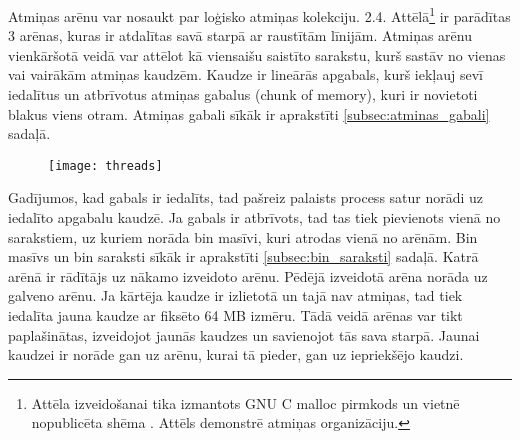 Atmiņas arēnu var nosaukt par loģisko atmiņas kolekciju. 2.4. Attēlā\footnote{Attēla izveidošanai tika izmantots GNU C malloc pirmkods \cite{MALLOC} un vietnē nopublicēta shēma \cite{AMM}. Attēls demonstrē atmiņas organizāciju.} ir parādītas 3 arēnas, kuras ir atdalītas savā starpā ar raustītām līnijām.
 Atmiņas arēnu  vienkāršotā veidā var attēlot kā viensaišu saistīto sarakstu, kurš sastāv no vienas vai vairākām atmiņas kaudzēm. 
 Kaudze ir lineārās apgabals, kurš iekļauj sevī iedalītus un atbrīvotus atmiņas gabalus (chunk of memory), kuri ir novietoti blakus viens otram.
 Atmiņas gabali sīkāk ir aprakstīti \ref{subsec:atminas_gabali} sadaļā.
 \begin{figure}[h]
\begin{center}
\texttt{[image: threads]}
\end{center}
\caption{\textbf{\fontsize{11}{12}\selectfont {Atmiņas organizācija GNU C bibliotēkā (versija 2.3)}}}
\end{figure}
 Gadījumos, kad gabals ir iedalīts, tad pašreiz palaists process satur norādi uz iedalīto apgabalu kaudzē. 
 Ja gabals ir atbrīvots, tad tas tiek pievienots vienā no sarakstiem, uz kuriem norāda bin masīvi, kuri atrodas vienā no arēnām.
Bin masīvs un bin saraksti sīkāk ir aprakstīti \ref{subsec:bin_saraksti} sadaļā. 
 Katrā arēnā ir rādītājs uz nākamo izveidoto arēnu. Pēdējā izveidotā arēna norāda uz galveno arēnu.
 Ja kārtēja kaudze ir izlietotā un tajā nav atmiņas, tad tiek iedalīta jauna kaudze ar fiksēto 64 MB izmēru.
  Tādā veidā arēnas var tikt paplašinātas, izveidojot jaunās kaudzes un savienojot tās sava starpā.
 Jaunai kaudzei ir norāde gan uz arēnu, kurai tā pieder, gan uz iepriekšējo kaudzi.


